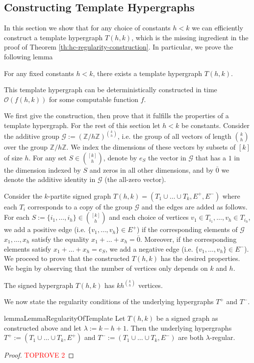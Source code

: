 \documentclass[a4paper,UKenglish,cleveref, autoref, thm-restate,numberwithinsect]{lipics-v2021}
\newcommand{\bigO}{\mathcal{O}}
\newcommand{\G}{\mathcal{G}}
\newcommand{\reg}{\lambda}
\begin{document}
\subsection{Constructing Template Hypergraphs} \label{sec:template-graphs}
In this section we show that for any choice of constants $h<k$ we can efficiently construct a template hypergraph $T(h,k)$, which is the missing ingredient in the proof of Theorem \ref{th:hc-regularity-construction}. In particular, we prove the following lemma
\begin{lemma}\label{lemma:template-graph-construction}
    For any fixed constants $h<k$, there exists a template hypergraph $T(h,k)$.
\end{lemma}
This template hypergraph can be deterministically constructed in time $\bigO(f(h,k))$ for some computable function $f$. 

We first give the construction, then prove that it fulfills the properties of a template hypergraph.
For the rest of this section let $h < k$ be constants. Consider the additive group $\G := \left(\mathbb Z/h\mathbb Z\right)^{\binom{k}{h}}$, i.e. the group of all vectors of length $\binom{k}{h}$ over the group $\mathbb Z/h\mathbb Z$. We index the dimensions of these vectors by subsets of $[k]$ of size $h$.
For any set $S\in \binom{[k]}{h}$, denote by $e_S$ the vector in $\G$ that has a $1$ in the dimension indexed by $S$ and zeros in all other dimensions, and by $\overline 0$ we denote the additive identity in $\G$ (the all-zero vector). 

Consider the $k$-partite signed graph $T(h,k) = (T_1\cup\dots \cup T_k, E^+,E^-)$ where each $T_i$ corresponds to a copy of the group $\G$ and the edges are added as follows.
For each $S:=\{i_1,\dots, i_h\}\in \binom{[k]}{h}$ and each choice of vertices $v_1\in T_{i_1},\dots, v_h\in T_{i_h}$, we add a positive edge (i.e. $\{v_1,\dots, v_h\}\in E^+$) if the corresponding elements of $\G$ $x_1,\dots, x_h$ satisfy the equality $x_1+\dots + x_h = \overline 0$.
Moreover, if the corresponding elements satisfy $x_1+\dots + x_h = e_S$, we add a negative edge (i.e. $\{v_1,\dots, v_h\}\in E^-$).
We proceed to prove that the constructed $T(h,k)$ has the desired properties. We begin by observing that the number of vertices only depends on $k$ and $h$.
\begin{observation}\label{obs:template-graph-clique}
    The signed hypergraph $T(h,k)$ has $kh^{\binom k h}$ vertices.
\end{observation}
We now state the regularity conditions of the underlying hypergraphs $T^+$ and $T^-$.
\begin{restatable}{lemma}{LemmaRegularityOfTemplate}\label{lemma:lambda-regularity-of-T}
    Let $T(h,k)$ be a signed graph as constructed above and let $\reg := k-h+1$. Then the underlying hypergraphs $T^+ := (T_1\cup\dots\cup T_k, E^+)$ and $T^-:=(T_1\cup\dots\cup T_k, E^-)$ are both $\reg$-regular.
\end{restatable}
\begin{proof}\textcolor{red}{TOPROVE 2}\end{proof}
\end{document}
